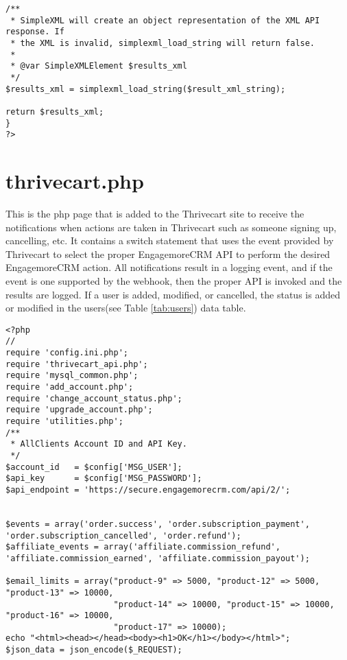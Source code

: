\documentclass[final,letterpaper,12pt]{article}
\begin{document}
\begin{appendices}
\begin{verbatim}
/**
 * SimpleXML will create an object representation of the XML API response. If
 * the XML is invalid, simplexml_load_string will return false.
 *
 * @var SimpleXMLElement $results_xml
 */
$results_xml = simplexml_load_string($result_xml_string);

return $results_xml;
}
?>
\end{verbatim}
\section{thrivecart.php}
\noindent This is the php page that is added to the Thrivecart site to receive the notifications when actions are taken in Thrivecart such as someone signing up, cancelling, etc.  It contains a switch statement that uses the event provided by Thrivecart to select the proper EngagemoreCRM API to perform the desired EngagemoreCRM action.  All notifications result in a logging event, and if the event is one supported by the webhook, then the proper API is invoked and the results are logged.  If a user is added, modified, or cancelled, the status is added or modified in the users(see Table \ref{tab:users}) data table.
\begin{verbatim}
<?php
//
require 'config.ini.php';
require 'thrivecart_api.php';
require 'mysql_common.php';
require 'add_account.php';
require 'change_account_status.php';
require 'upgrade_account.php';
require 'utilities.php';
/**
 * AllClients Account ID and API Key.
 */
$account_id   = $config['MSG_USER'];
$api_key      = $config['MSG_PASSWORD'];
$api_endpoint = 'https://secure.engagemorecrm.com/api/2/';


$events = array('order.success', 'order.subscription_payment', 'order.subscription_cancelled', 'order.refund');
$affiliate_events = array('affiliate.commission_refund', 'affiliate.commission_earned', 'affiliate.commission_payout');

$email_limits = array("product-9" => 5000, "product-12" => 5000, "product-13" => 10000,
                      "product-14" => 10000, "product-15" => 10000, "product-16" => 10000,
                      "product-17" => 10000);
echo "<html><head></head><body><h1>OK</h1></body></html>";
$json_data = json_encode($_REQUEST);


\end{verbatim}
\end{appendices}
\end{document}

